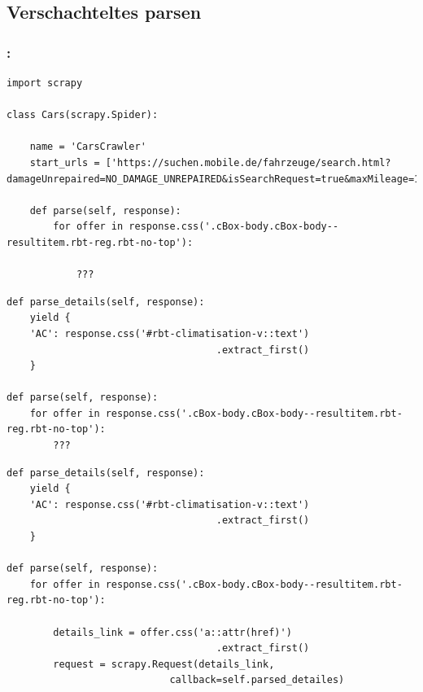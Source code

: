 \documentclass{beamer}
\begin{document}
\subsection{Verschachteltes parsen}
\begin{frame}
	\frametitle{\insertsection{}: \insertsubsection{}}
		\begin{lstlisting}
import scrapy

class Cars(scrapy.Spider):
    
    name = 'CarsCrawler'
    start_urls = ['https://suchen.mobile.de/fahrzeuge/search.html?damageUnrepaired=NO_DAMAGE_UNREPAIRED&isSearchRequest=true&maxMileage=100&maxPowerAsArray=PS&minPowerAsArray=35&minPowerAsArray=PS&minPrice=5000&scopeId=C&usage=NEW&usageType=PRE_REGISTRATION']
		
    def parse(self, response):
        for offer in response.css('.cBox-body.cBox-body--resultitem.rbt-reg.rbt-no-top'): 

            ???
        \end{lstlisting}
        
	\framebreak
	
	
		\begin{lstlisting}
def parse_details(self, response):
    yield {
    'AC': response.css('#rbt-climatisation-v::text')
                                    .extract_first()
    }
        
def parse(self, response):
    for offer in response.css('.cBox-body.cBox-body--resultitem.rbt-reg.rbt-no-top'): 
        ???

        \end{lstlisting}
        
	\framebreak
	

		\begin{lstlisting}
def parse_details(self, response):
    yield {
    'AC': response.css('#rbt-climatisation-v::text')
                                    .extract_first()
    }
     
def parse(self, response):
    for offer in response.css('.cBox-body.cBox-body--resultitem.rbt-reg.rbt-no-top'): 
            
        details_link = offer.css('a::attr(href)')
                                    .extract_first()
        request = scrapy.Request(details_link,
                            callback=self.parsed_detailes)
            

\end{lstlisting}
\end{frame}
\end{document}
